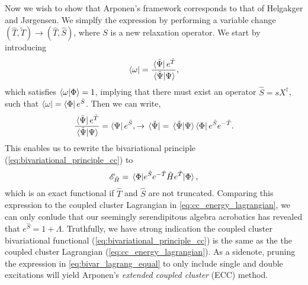 Now we wish to show that Arponen's framework corresponds to that of Helgakger and 
Jørgensen. We simplfy the expression by performing a variable change 
$(\hat{T}, \tilde{T}) \to (\hat{T}, \hat{S})$, where $S$ is a new relaxation operator.
We start by introducing 
\begin{equation}
    \bra{\omega} = \frac{\bra*{\tilde{\Psi}}e^{\hat{T}}}{\braket*{\tilde{\Psi}}{\Psi}},
\end{equation}
which satisfies $\braket{\omega}{\Phi} = 1$, implying that there must exist an operator
$\hat{S} = sX^\dagger$, such that $\bra{\omega} = \bra{\Phi}e^{\hat{S}}$. Then we 
can write,
\begin{equation}
    \begin{gathered}
        \frac{\bra*{\tilde{\Psi}}e^{\hat{T}}}{\braket*{\tilde{\Psi}}{\Psi}}
        = \bra{\Psi} e^{\hat{S}},
        \to \bra*{\tilde{\Psi}} 
        = \braket*{\tilde{\Psi}}{\Psi}\bra{\Phi}e^{\hat{S}}e^{-\hat{T}}.
    \end{gathered}
\end{equation}
This enables us to rewrite the bivariational principle (\autoref{eq:bivariational_principle_cc})
to 
\begin{equation}
    \label{eq:bivar_lagrang_equal}
    \mathscr{E}_{\hat{H}} = \mel{\Phi}{e^{\hat{S}}e^{-\hat{T}}\hat{H}e^{\hat{T}}}{\Phi},
\end{equation} 
which is an exact functional if $\hat{T}$ and $\hat{S}$ are not truncated. Comparing this 
expression to the coupled cluster Lagrangian in \autoref{eq:cc_energy_lagrangian}, we can only
conlude that our seemingly serendipitous algebra acrobatics has revealed that
$e^{\hat{S}} = 1 + \Lambda$. Truthfully, we have strong indication the coupled cluster bivariational 
functional (\autoref{eq:bivariational_principle_cc}) is the same as the the 
coupled cluster Lagrangian (\autoref{eq:cc_energy_lagrangian}). As a sidenote, pruning 
the expression in \autoref{eq:bivar_lagrang_equal} to only include single and double 
excitations will yield Arponen's \emph{extended coupled cluster} (ECC) method.

